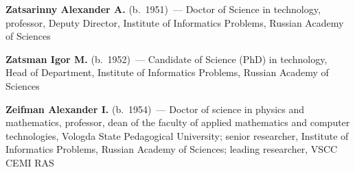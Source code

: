 \begin{multicols}{2}
\noindent
\textbf{Zatsarinny Alexander A.} (b.\ 1951)~--- Doctor of Science in technology, professor, 
Deputy Director, Institute of Informatics Problems, Russian Academy of Sciences
\columnbreak

\noindent
\textbf{Zatsman Igor M.} (b.\ 1952)~--- Candidate of Science (PhD) in technology, Head of Department, 
Institute of Informatics Problems, Russian Academy of Sciences


\vspace*{3pt}

\noindent
\textbf{Zeifman Alexander I.} (b.\ 1954)~--- Doctor of science in physics and
mathematics, professor, dean of the faculty of applied mathematics
and computer technologies, Vologda State Pedagogical University;
senior researcher, Institute of Informatics Problems, Russian Academy of Sciences; leading
researcher, VSCC CEMI RAS

\thispagestyle{empty}

\end{multicols}